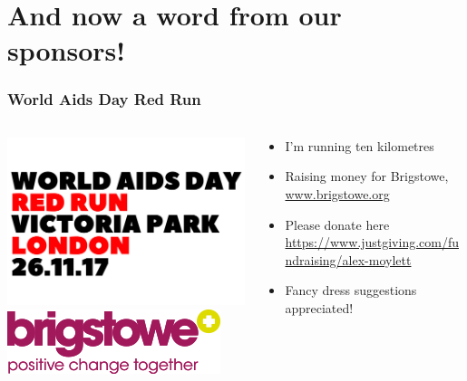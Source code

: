 \documentclass[notes]{beamer}
\begin{document}
\section{And now a word from our sponsors!}

\begin{frame}
\frametitle{World Aids Day Red Run}

  \begin{columns}[T]
    \begin{column}{.5\textwidth}
    \begin{center}
    \includegraphics[scale=0.4]{RR-logo}\\
    \includegraphics[scale=0.7]{brigstowe}
    \end{center}
    \end{column}
    \begin{column}{.5\textwidth}
    \begin{itemize}
    \item I'm running ten kilometres
    
    \item Raising money for Brigstowe, \url{www.brigstowe.org}
    
    \item Please donate here \url{https://www.justgiving.com/fundraising/alex-moylett}
    
    \item Fancy dress suggestions appreciated!
    \end{itemize}
    \end{column}
  \end{columns}

\end{frame}
\end{document}
